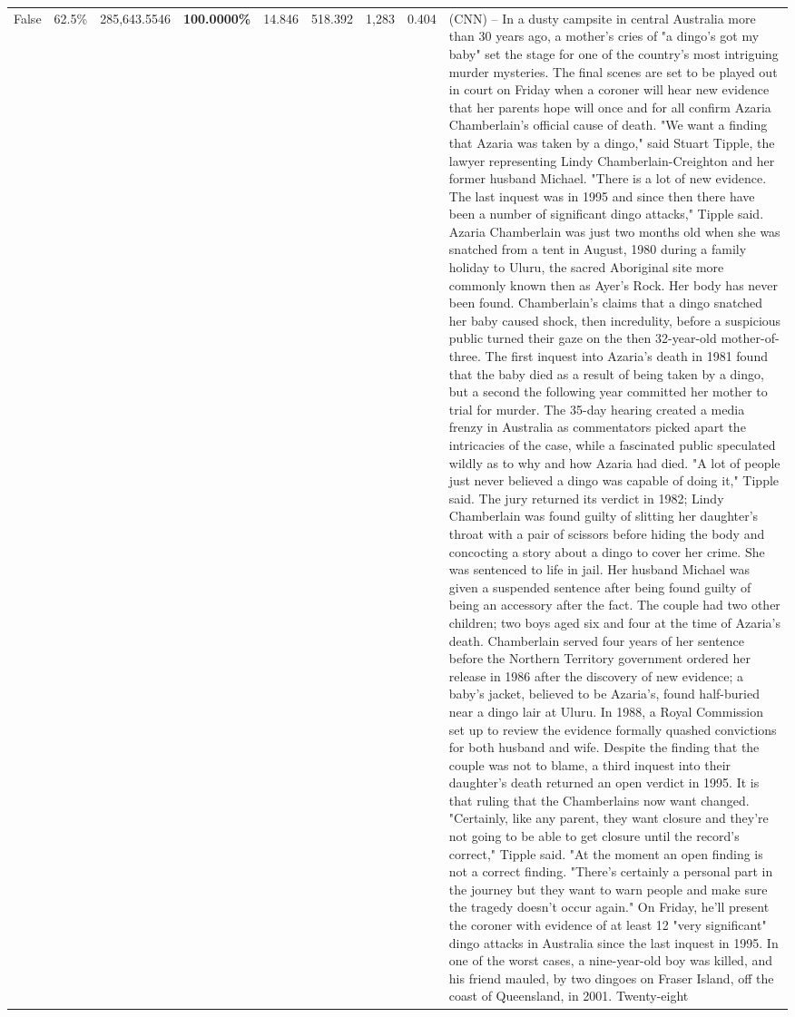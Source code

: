 \begin{table}[H]
\begin{tabular}{lllrlllll}
False & 62.5\% & \color{red} 285,643.5546 & \bfseries \color{red} 100.0000\% & 14.846 & 518.392 & 1,283 & 0.404 & (CNN) -- In a dusty campsite in central Australia more than 30 years ago, a mother's cries of "a dingo's got my baby" set the stage for one of the country's most intriguing murder mysteries. The final scenes are set to be played out in court on Friday when a coroner will hear new evidence that her parents hope will once and for all confirm Azaria Chamberlain's official cause of death. "We want a finding that Azaria was taken by a dingo," said Stuart Tipple, the lawyer representing Lindy Chamberlain-Creighton and her former husband Michael. "There is a lot of new evidence. The last inquest was in 1995 and since then there have been a number of significant dingo attacks," Tipple said. Azaria Chamberlain was just two months old when she was snatched from a tent in August, 1980 during a family holiday to Uluru, the sacred Aboriginal site more commonly known then as Ayer's Rock. Her body has never been found. Chamberlain's claims that a dingo snatched her baby caused shock, then incredulity, before a suspicious public turned their gaze on the then 32-year-old mother-of-three. The first inquest into Azaria's death in 1981 found that the baby died as a result of being taken by a dingo, but a second the following year committed her mother to trial for murder. The 35-day hearing created a media frenzy in Australia as commentators picked apart the intricacies of the case, while a fascinated public speculated wildly as to why and how Azaria had died. "A lot of people just never believed a dingo was capable of doing it," Tipple said. The jury returned its verdict in 1982; Lindy Chamberlain was found guilty of slitting her daughter's throat with a pair of scissors before hiding the body and concocting a story about a dingo to cover her crime. She was sentenced to life in jail. Her husband Michael was given a suspended sentence after being found guilty of being an accessory after the fact. The couple had two other children; two boys aged six and four at the time of Azaria's death. Chamberlain served four years of her sentence before the Northern Territory government ordered her release in 1986 after the discovery of new evidence; a baby's jacket, believed to be Azaria's, found half-buried near a dingo lair at Uluru. In 1988, a Royal Commission set up to review the evidence formally quashed convictions for both husband and wife. Despite the finding that the couple was not to blame, a third inquest into their daughter's death returned an open verdict in 1995. It is that ruling that the Chamberlains now want changed. "Certainly, like any parent, they want closure and they're not going to be able to get closure until the record's correct," Tipple said. "At the moment an open finding is not a correct finding. "There's certainly a personal part in the journey but they want to warn people and make sure the tragedy doesn't occur again." On Friday, he'll present the coroner with evidence of at least 12 "very significant" dingo attacks in Australia since the last inquest in 1995. In one of the worst cases, a nine-year-old boy was killed, and his friend mauled, by two dingoes on Fraser Island, off the coast of Queensland, in 2001. Twenty-eight 
\end{tabular}
\end{table}
